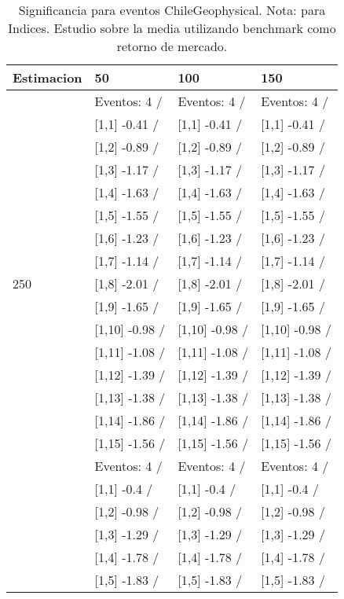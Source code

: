 \begin{table}

\caption{Significancia para eventos ChileGeophysical. Nota: para Indices. Estudio sobre la media utilizando benchmark como retorno de mercado.}
\centering
\begin{tabular}[t]{llll}
\toprule
Estimacion & 50 & 100 & 150\\
\midrule
 & Eventos:  4 / & Eventos:  4 / & Eventos:  4 /\\
 & {}[1,1] -0.41  / & {}[1,1] -0.41  / & {}[1,1] -0.41  /\\
 & {}[1,2] -0.89  / & {}[1,2] -0.89  / & {}[1,2] -0.89  /\\
 & {}[1,3] -1.17  / & {}[1,3] -1.17  / & {}[1,3] -1.17  /\\
 & {}[1,4] -1.63  / & {}[1,4] -1.63  / & {}[1,4] -1.63  /\\
\addlinespace
 & {}[1,5] -1.55  / & {}[1,5] -1.55  / & {}[1,5] -1.55  /\\
 & {}[1,6] -1.23  / & {}[1,6] -1.23  / & {}[1,6] -1.23  /\\
 & {}[1,7] -1.14  / & {}[1,7] -1.14  / & {}[1,7] -1.14  /\\
250 & {}[1,8] -2.01  / & {}[1,8] -2.01  / & {}[1,8] -2.01  /\\
 & {}[1,9] -1.65  / & {}[1,9] -1.65  / & {}[1,9] -1.65  /\\
\addlinespace
 & {}[1,10] -0.98  / & {}[1,10] -0.98  / & {}[1,10] -0.98  /\\
 & {}[1,11] -1.08  / & {}[1,11] -1.08  / & {}[1,11] -1.08  /\\
 & {}[1,12] -1.39  / & {}[1,12] -1.39  / & {}[1,12] -1.39  /\\
 & {}[1,13] -1.38  / & {}[1,13] -1.38  / & {}[1,13] -1.38  /\\
 & {}[1,14] -1.86  / & {}[1,14] -1.86  / & {}[1,14] -1.86  /\\
\addlinespace
 & {}[1,15] -1.56  / & {}[1,15] -1.56  / & {}[1,15] -1.56  /\\
 & Eventos:  4 / & Eventos:  4 / & Eventos:  4 /\\
 & {}[1,1] -0.4  / & {}[1,1] -0.4  / & {}[1,1] -0.4  /\\
 & {}[1,2] -0.98  / & {}[1,2] -0.98  / & {}[1,2] -0.98  /\\
 & {}[1,3] -1.29  / & {}[1,3] -1.29  / & {}[1,3] -1.29  /\\
\addlinespace
 & {}[1,4] -1.78  / & {}[1,4] -1.78  / & {}[1,4] -1.78  /\\
 & {}[1,5] -1.83  / & {}[1,5] -1.83  / & {}[1,5] -1.83  /\\

\end{tabular}
\end{table}
